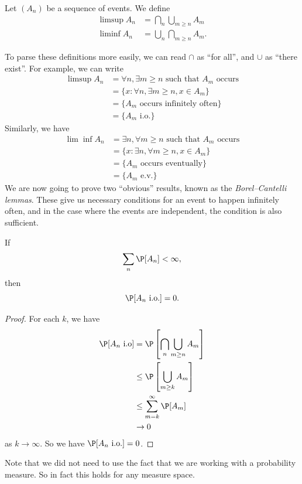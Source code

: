 \documentclass[a4paper]{article}
\begin{document}
\begin{defi}\index{$\limsup$}\index{$\liminf$}
  Let $(A_n)$ be a sequence of events. We define
  \begin{align*}
    \limsup A_n &= \bigcap_n \bigcup_{m \geq n} A_m\\
    \liminf A_n &= \bigcup_n \bigcap_{m \geq n} A_m.
  \end{align*}
\end{defi}
To parse these definitions more easily, we can read $\cap$ as ``for all'', and $\cup$ as ``there exist''. For example, we can write
\begin{align*}
  \limsup A_n &= \forall n,\exists m \geq n\text{ such that }A_m\text{ occurs}\\
  &= \{x: \forall n, \exists m \geq n, x \in A_m\}\\
  &= \{A_m\text{ occurs infinitely often}\}\\
  &= \{A_m \text{ i.o.}\}
\end{align*}
Similarly, we have
\begin{align*}
  \lim\inf A_n &= \exists n, \forall m \geq n\text{ such that }A_m\text{ occurs}\\
  &= \{x: \exists n, \forall m \geq n, x \in A_m\}\\
  &= \{A_m\text{ occurs eventually}\}\\
  &= \{A_m\text{ e.v.}\}
\end{align*}
We are now going to prove two ``obvious'' results, known as the \emph{Borel--Cantelli lemmas}. These give us necessary conditions for an event to happen infinitely often, and in the case where the events are independent, the condition is also sufficient.

\begin{lemma}
  If
  \[
    \sum_n \P[A_n] < \infty,
  \]
  then
  \[
    \P[A_n\text{ i.o.}] = 0.
  \]
\end{lemma}

\begin{proof}
  For each $k$, we have
  \begin{align*}
    \P[A_n\text{ i.o}] &= \P\left[\bigcap_n \bigcup_{m \geq n} A_m\right]\\
    &\leq \P\left[\bigcup_{m \geq k} A_m\right]\\
    &\leq \sum_{m = k}^\infty \P[A_m]\\
    &\to 0
  \end{align*}
  as $k \to \infty$. So we have $\P[A_n\text{ i.o.}] = 0$.
\end{proof}
Note that we did not need to use the fact that we are working with a probability measure. So in fact this holds for any measure space.
\end{document}
